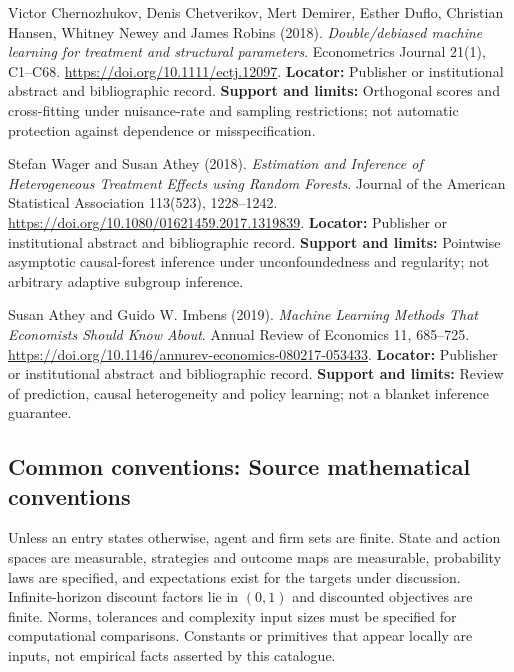 \documentclass[11pt,a4paper]{article}
\begin{document}
\begin{enumerate}[label={[\textnormal{S}\arabic*]},leftmargin=*]

\item Victor Chernozhukov, Denis Chetverikov, Mert Demirer, Esther Duflo, Christian Hansen, Whitney Newey and James Robins (2018). \emph{Double/debiased machine learning for treatment and structural parameters}. Econometrics Journal 21(1), C1–C68. \url{https://doi.org/10.1111/ectj.12097}. \textbf{Locator:} Publisher or institutional abstract and bibliographic record. \textbf{Support and limits:} Orthogonal scores and cross-fitting under nuisance-rate and sampling restrictions; not automatic protection against dependence or misspecification.

\item Stefan Wager and Susan Athey (2018). \emph{Estimation and Inference of Heterogeneous Treatment Effects using Random Forests}. Journal of the American Statistical Association 113(523), 1228–1242. \url{https://doi.org/10.1080/01621459.2017.1319839}. \textbf{Locator:} Publisher or institutional abstract and bibliographic record. \textbf{Support and limits:} Pointwise asymptotic causal-forest inference under unconfoundedness and regularity; not arbitrary adaptive subgroup inference.

\item Susan Athey and Guido W. Imbens (2019). \emph{Machine Learning Methods That Economists Should Know About}. Annual Review of Economics 11, 685–725. \url{https://doi.org/10.1146/annurev-economics-080217-053433}. \textbf{Locator:} Publisher or institutional abstract and bibliographic record. \textbf{Support and limits:} Review of prediction, causal heterogeneity and policy learning; not a blanket inference guarantee.

\end{enumerate}

\subsection*{Common conventions: Source mathematical conventions}

Unless an entry states otherwise, agent and firm sets are finite. State and action spaces are measurable, strategies and outcome maps are measurable, probability laws are specified, and expectations exist for the targets under discussion. Infinite-horizon discount factors lie in $(0,1)$ and discounted objectives are finite. Norms, tolerances and complexity input sizes must be specified for computational comparisons. Constants or primitives that appear locally are inputs, not empirical facts asserted by this catalogue.
\end{document}
